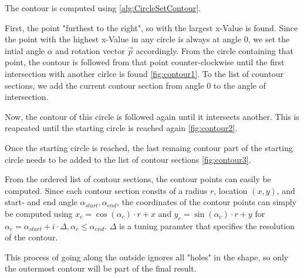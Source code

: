 The contour is computed using \autoref{alg:CircleSetContour}.

First, the point "furthest to the right", so with the largest x-Value is found. 
Since the point with the highest x-Value in any circle is always at angle 0, we set the intial angle $\alpha$ and rotation vector $\vec{p}$ accordingly.
From the circle containing that point, the contour is followed from that point counter-clockwise until the first intersection with another cirlce is found \autoref{fig:contour1}.
To the list of countour sections, we add the current contour section from angle 0 to the angle of intersection.

Now, the contour of this circle is followed again until it intersects another. This is reapeated until the starting circle is reached again \autoref{fig:contour2}.

Once the starting circle is reached, the last remaing contour part of the starting circle needs to be added to the list of contour sections \autoref{fig:contour3}.

From the ordered list of contour sections, the contour points can easily be computed.
Since each contour section consits of a radius $r$, location $(x,y)$, and start- and end angle $\alpha_{start}, \alpha_{end}$, the coordinates of the contour points can simply be computed using $x_c = \cos(\alpha_c) \cdot r + x$ and  $y_c = \sin(\alpha_c) \cdot r + y$ 
for $\alpha_c = \alpha_{start} + i \cdot \Delta, \alpha_c \leq \alpha_{end}$.
$\Delta$ is a tuning paramter that specifies the resolution of the contour.

This process of going along the outside ignores all "holes" in the shape, so only the outermost contour will be part of the final result. 

